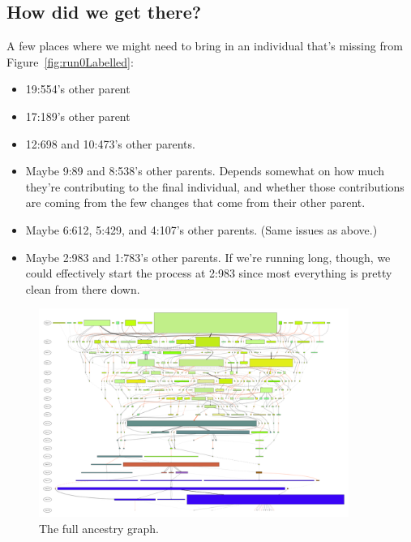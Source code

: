 \subsection{How did we get there?}

A few places where we might need to bring in an individual that's 
missing from Figure~\ref{fig:run0Labelled}:
\begin{itemize}
	\item 19:554's other parent
	\item 17:189's other parent
	\item 12:698 and 10:473's other parents.
	\item Maybe 9:89 and 8:538's other parents. Depends somewhat on how much
	they're contributing to the final individual, and whether those 
	contributions are coming from the few changes that come from their other
	parent.
	\item Maybe 6:612, 5:429, and 4:107's other parents. (Same issues as above.)
	\item Maybe 2:983 and 1:783's other parents. If we're running long, though, 
	we could effectively start the process at 2:983 since most everything is
	pretty clean from there down.
\end{itemize}


\begin{figure}[tb!p] %
	\begin{center}
		\includegraphics[width=0.9\textwidth]{../figures/run0_RBM_color_full_30000}
	\end{center}
	\caption{The full ancestry graph.}
	\label{fig:run0full}       %
\end{figure}


